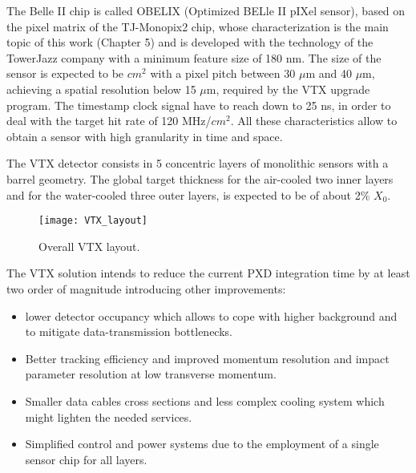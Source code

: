 \begin{comment}
The program hopes to solve some of the issues discussed in the previous chapters, with a new system of two inner layers and three outermost, for a total of 5 stages equipped with a single sensro type, called \textbf{VTX} (layout in~\autoref{fig:VTX_layout}). Also the mechanical structure has been redesigned but it is expected that the all system could work at room temperature, so as consequence an important reduction of services is also contemplated.\\
\end{comment}

The Belle II chip is called OBELIX (Optimized BELle II pIXel sensor), based on the pixel matrix of the TJ-Monopix2 chip, whose characterization is the main topic of this work (Chapter 5) and is developed with the technology of the TowerJazz company with a minimum feature size of 180 nm. 
The size of the sensor is expected to be  $cm^{2}$ with a pixel pitch between 30 $\mu$m and 40 $\mu$m, achieving a spatial resolution below 15 $\mu$m, required by the VTX upgrade program. The timestamp clock signal have to reach down to 25 ns, in order to deal with the target hit rate of 120 MHz/$cm^{2}$. All these characteristics allow to obtain a sensor with high granularity in time and space.

The VTX detector consists in 5 concentric layers of monolithic sensors with a barrel geometry. The global target thickness for the air-cooled two inner layers and for the water-cooled three outer layers, is expected to be of about 2\% $X_{0}$.

\begin{figure}[h!]
\centering
\texttt{[image: VTX\_layout]}
\caption{Overall VTX layout.}
\label{fig:VTX_layout}
\end{figure}

The VTX solution intends to reduce the current PXD integration time by at least two order of magnitude introducing other improvements:

\begin{itemize}
\item lower detector occupancy which allows to cope with higher background and to mitigate data-transmission bottlenecks.
\item Better tracking efficiency and improved momentum resolution and impact parameter resolution at low transverse momentum.
\item Smaller data cables cross sections and less complex cooling system which might lighten the needed services.
\item Simplified control and power systems due to the employment of a single sensor chip for all layers.
\end{itemize}

